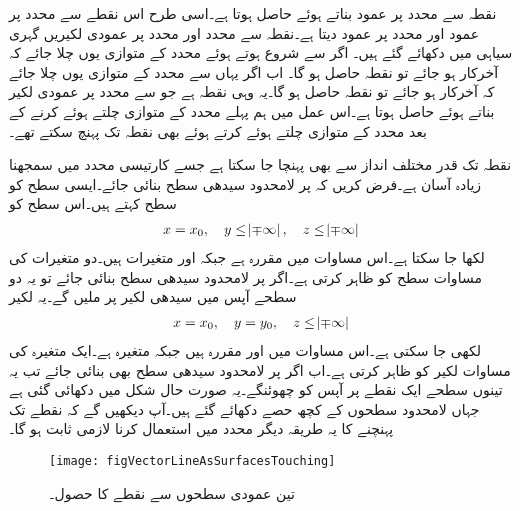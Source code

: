  نقطہ  سے  محدد پر عمود بناتے ہوئے   حاصل ہوتا ہے۔اسی طرح اس نقطے سے  محدد پر عمود  اور  محدد پر عمود  دیتا ہے۔نقطہ  سے  محدد اور  محدد پر عمودی لکیریں گہری سیاہی میں دکھائے گئے ہیں۔ اگر  سے  شروع ہوتے ہوئے  محدد کے متوازی یوں چلا جائے کہ آخرکار  ہو جائے تو نقطہ  حاصل ہو گا۔ اب اگر یہاں سے  محدد کے متوازی یوں چلا جائے کہ آخرکار  ہو جائے تو نقطہ  حاصل ہو گا۔یہ وہی نقطہ ہے جو  سے  محدد پر عمودی لکیر بناتے ہوئے حاصل ہوتا ہے۔اس عمل میں ہم پہلے  محدد کے متوازی چلتے ہوئے  کرنے کے بعد  محدد کے متوازی چلتے ہوئے  کرتے ہوئے بھی نقطہ  تک پہنچ سکتے تھے۔

نقطہ  تک قدر مختلف انداز سے بھی پہنچا جا سکتا ہے جسے کارتیسی محدد میں سمجھنا زیادہ آسان ہے۔فرض کریں کہ  پر لامحدود  سیدھی سطح بنائی جائے۔ایسی سطح کو  سطح  کہتے ہیں۔اس سطح کو
\begin{align*}
x=x_0, \quad  y\le \abs{\mp \infty}, \quad z \le \abs{\mp \infty}
\end{align*}
لکھا جا سکتا ہے۔اس مساوات میں  مقررہ ہے جبکہ  اور  متغیرات ہیں۔دو متغیرات کی مساوات سطح کو ظاہر کرتی ہے۔اگر  پر لامحدود  سیدھی سطح بنائی جائے تو یہ دو سطحے  آپس میں سیدھی لکیر پر ملیں گے۔یہ لکیر
\begin{align*}
x=x_0, \quad  y=y_0, \quad z \le \abs{\mp \infty}
\end{align*}
لکھی جا سکتی ہے۔اس مساوات میں  اور  مقررہ ہیں جبکہ  متغیرہ ہے۔ایک متغیرہ کی مساوات لکیر کو ظاہر کرتی ہے۔اب اگر  پر لامحدود  سیدھی سطح بھی بنائی جائے تب یہ تینوں سطحے ایک نقطے  پر آپس کو چھوئنگے۔یہ صورت حال شکل  میں دکھائی گئی ہے جہاں لامحدود سطحوں کے کچھ حصے دکھائے گئے ہیں۔آپ دیکھیں گے کہ نقطے تک پہنچنے کا یہ طریقہ دیگر محدد میں استعمال کرنا لازمی ثابت ہو گا۔
\begin{figure}
\centering
\texttt{[image: figVectorLineAsSurfacesTouching]}
\caption{تین عمودی سطحوں سے نقطے کا حصول۔}
\label{شکل_سمتیہ_تین_عمودی_سطحوں_سے_نقطہ}
\end{figure}

